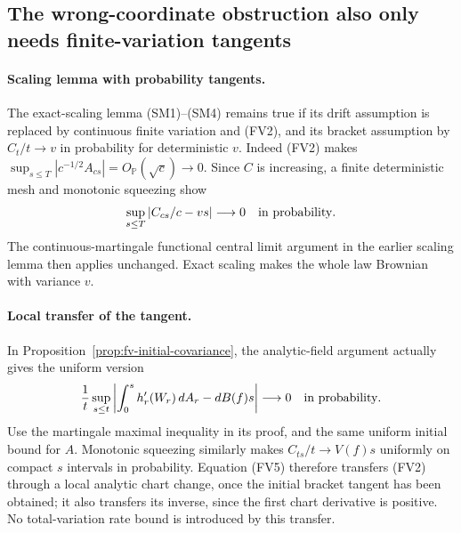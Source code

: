 \documentclass[11pt]{article}
\theoremstyle{definition}\newtheorem{definition}[theorem]{Definition}
\theoremstyle{remark}\newtheorem{remark}[theorem]{Remark}
\begin{document}
\subsection{The wrong-coordinate obstruction also only needs finite-variation tangents}

\paragraph{Scaling lemma with probability tangents.}
The exact-scaling lemma (SM1)--(SM4) remains true if its drift assumption
is replaced by continuous finite variation and (FV2), and its bracket
assumption by $C_t/t\to v$ in probability for deterministic $v$.
Indeed (FV2) makes
$\sup_{s\le T}|c^{-1/2}A_{cs}|=O_{\mathbb P}(\sqrt c)\to0$.
Since $C$ is increasing, a finite deterministic mesh and monotonic
squeezing show
\[
 \sup_{s\le T}|C_{cs}/c-vs|\longrightarrow0
           \quad\hbox{in probability}.
\]
The continuous-martingale functional central limit argument in the earlier
scaling lemma then applies unchanged. Exact scaling makes the whole law
Brownian with variance $v$.

\paragraph{Local transfer of the tangent.}
In Proposition~\ref{prop:fv-initial-covariance}, the analytic-field
argument actually gives the uniform version
\[
 \frac1t\sup_{s\le t}
 \left|\int_0^s h_r'(W_r)\,dA_r-dB(f)s\right|
          \longrightarrow0
          \quad\hbox{in probability}.
\]
Use the martingale maximal inequality in its proof, and the same uniform
initial bound for $A$. Monotonic squeezing similarly makes
$C_{ts}/t\to V(f)s$ uniformly on compact $s$ intervals in probability.
Equation (FV5) therefore transfers (FV2) through a local analytic chart
change, once the initial bracket tangent has been obtained; it also
transfers its inverse, since the first chart derivative is positive.
No total-variation rate bound is introduced by this transfer.
\end{document}
